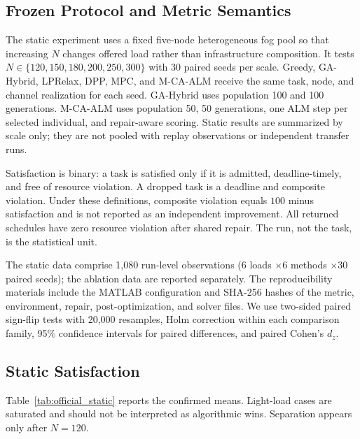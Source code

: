 \documentclass[pdflatex,sn-mathphys-num]{sn-jnl}
\begin{document}
\subsection{Frozen Protocol and Metric Semantics}
The static experiment uses a fixed five-node heterogeneous fog pool so that increasing $N$ changes offered load rather than infrastructure composition. It tests $N\in\{120,150,180,200,250,300\}$ with 30 paired seeds per scale. Greedy, GA-Hybrid, LPRelax, DPP, MPC, and M-CA-ALM receive the same task, node, and channel realization for each seed. GA-Hybrid uses population 100 and 100 generations. M-CA-ALM uses population 50, 50 generations, one ALM step per selected individual, and repair-aware scoring. Static results are summarized by scale only; they are not pooled with replay observations or independent transfer runs.

Satisfaction is binary: a task is satisfied only if it is admitted, deadline-timely, and free of resource violation. A dropped task is a deadline and composite violation. Under these definitions, composite violation equals $100$ minus satisfaction and is not reported as an independent improvement. All returned schedules have zero resource violation after shared repair. The run, not the task, is the statistical unit.

The static data comprise 1,080 run-level observations ($6$ loads $\times 6$ methods $\times 30$ paired seeds); the ablation data are reported separately. The reproducibility materials include the MATLAB configuration and SHA-256 hashes of the metric, environment, repair, post-optimization, and solver files. We use two-sided paired sign-flip tests with 20,000 resamples, Holm correction within each comparison family, 95\% confidence intervals for paired differences, and paired Cohen's $d_z$.

\subsection{Static Satisfaction}
Table~\ref{tab:official_static} reports the confirmed means. Light-load cases are saturated and should not be interpreted as algorithmic wins. Separation appears only after $N=120$.
\end{document}
